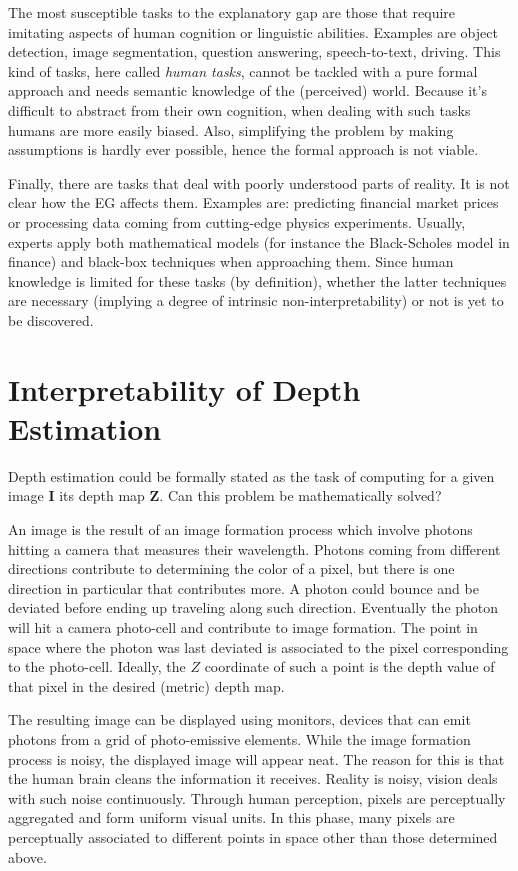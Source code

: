 The most susceptible tasks to the explanatory gap are those that require imitating aspects of human cognition or linguistic abilities.
Examples are object detection, image segmentation, question answering, speech-to-text, driving.
This kind of tasks, here called \textit{human tasks}, cannot be tackled with a pure formal approach and needs semantic knowledge of the (perceived) world.
Because it's difficult to abstract from their own cognition, when dealing with such tasks humans are more easily biased.
Also, simplifying the problem by making assumptions is hardly ever possible, hence the formal approach is not viable.

Finally, there are tasks that deal with poorly understood parts of reality.
It is not clear how the EG affects them.
Examples are: predicting financial market prices or processing data coming from cutting-edge physics experiments.
Usually, experts apply both mathematical models (for instance the Black-Scholes model in finance) and black-box techniques when approaching them.
Since human knowledge is limited for these tasks (by definition), whether the latter techniques are necessary (implying a degree of intrinsic non-interpretability) or not is yet to be discovered.

\section{Interpretability of Depth Estimation}
\label{sec:interpretability of depth estimation}

Depth estimation could be formally stated as the task of computing for a given image $\mathbf{I}$ its depth map $\mathbf{Z}$.
Can this problem be mathematically solved?

An image is the result of an image formation process which involve photons hitting a camera that measures their wavelength.
Photons coming from different directions contribute to determining the color of a pixel, but there is one direction in particular that contributes more.
A photon could bounce and be deviated before ending up traveling along such direction.
Eventually the photon will hit a camera photo-cell and contribute to image formation.
The point in space where the photon was last deviated is associated to the pixel corresponding to the photo-cell.
Ideally, the $Z$ coordinate of such a point is the depth value of that pixel in the desired (metric) depth map.

The resulting image can be displayed using monitors, devices that can emit photons from a grid of photo-emissive elements.
While the image formation process is noisy, the displayed image will appear neat.
The reason for this is that the human brain cleans the information it receives.
Reality is noisy, vision deals with such noise continuously.
Through human perception, pixels are perceptually aggregated and form uniform visual units.
In this phase, many pixels are perceptually associated to different points in space other than those determined above.

